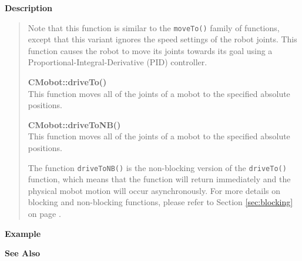 {\bf Description}\\
\vspace{-12pt}
\begin{quote}
Note that this function is similar to the \texttt{moveTo()} family of functions, except
that this variant ignores the speed settings of the robot joints. This function causes
the robot to move its joints towards its goal using a Proportional-Integral-Derivative (PID)
controller.

{\bf CMobot::driveTo()}\\
This function moves all of the joints of a mobot to the specified absolute positions. 

{\bf CMobot::driveToNB()}\\
This function moves all of the joints of a mobot to the specified absolute positions. 

The function \texttt{driveToNB()} is the non-blocking version of
the \texttt{driveTo()} function, which means that the function will return
immediately and the physical mobot motion will occur asynchronously. For
more details on blocking and non-blocking functions, please refer to 
Section \ref{sec:blocking} on page \pageref{sec:blocking}.\\
\end{quote}

\noindent
{\bf Example}\\
\noindent

\noindent
{\bf See Also}\\

